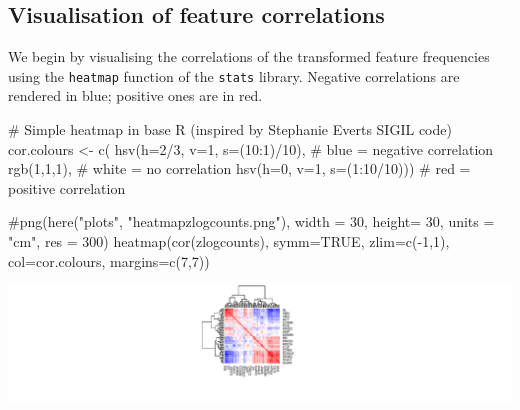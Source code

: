 \documentclass[
  letterpaper,
  DIV=11,
  numbers=noendperiod]{scrreprt}
\newenvironment{Shaded}{\begin{snugshade}}{\end{snugshade}}
\newcommand{\AttributeTok}[1]{\textcolor[rgb]{0.40,0.45,0.13}{#1}}
\newcommand{\CommentTok}[1]{\textcolor[rgb]{0.37,0.37,0.37}{#1}}
\newcommand{\ConstantTok}[1]{\textcolor[rgb]{0.56,0.35,0.01}{#1}}
\newcommand{\DecValTok}[1]{\textcolor[rgb]{0.68,0.00,0.00}{#1}}
\newcommand{\FunctionTok}[1]{\textcolor[rgb]{0.28,0.35,0.67}{#1}}
\newcommand{\NormalTok}[1]{\textcolor[rgb]{0.00,0.23,0.31}{#1}}
\newcommand{\OtherTok}[1]{\textcolor[rgb]{0.00,0.23,0.31}{#1}}
\newcommand{\SpecialCharTok}[1]{\textcolor[rgb]{0.37,0.37,0.37}{#1}}
\begin{document}
\subsection{Visualisation of feature
correlations}\label{visualisation-of-feature-correlations}

We begin by visualising the correlations of the transformed feature
frequencies using the \texttt{heatmap} function of the \texttt{stats}
library. Negative correlations are rendered in blue; positive ones are
in red.

\begin{Shaded}
\begin{Highlighting}[]
\CommentTok{\# Simple heatmap in base R (inspired by Stephanie Evert\textquotesingle{}s SIGIL code)}
\NormalTok{cor.colours }\OtherTok{\textless{}{-}} \FunctionTok{c}\NormalTok{(}
  \FunctionTok{hsv}\NormalTok{(}\AttributeTok{h=}\DecValTok{2}\SpecialCharTok{/}\DecValTok{3}\NormalTok{, }\AttributeTok{v=}\DecValTok{1}\NormalTok{, }\AttributeTok{s=}\NormalTok{(}\DecValTok{10}\SpecialCharTok{:}\DecValTok{1}\NormalTok{)}\SpecialCharTok{/}\DecValTok{10}\NormalTok{), }\CommentTok{\# blue = negative correlation }
  \FunctionTok{rgb}\NormalTok{(}\DecValTok{1}\NormalTok{,}\DecValTok{1}\NormalTok{,}\DecValTok{1}\NormalTok{), }\CommentTok{\# white = no correlation }
  \FunctionTok{hsv}\NormalTok{(}\AttributeTok{h=}\DecValTok{0}\NormalTok{, }\AttributeTok{v=}\DecValTok{1}\NormalTok{, }\AttributeTok{s=}\NormalTok{(}\DecValTok{1}\SpecialCharTok{:}\DecValTok{10}\SpecialCharTok{/}\DecValTok{10}\NormalTok{))) }\CommentTok{\# red = positive correlation}

\CommentTok{\#png(here("plots", "heatmapzlogcounts.png"), width = 30, height= 30, units = "cm", res = 300)}
\FunctionTok{heatmap}\NormalTok{(}\FunctionTok{cor}\NormalTok{(zlogcounts), }
        \AttributeTok{symm=}\ConstantTok{TRUE}\NormalTok{, }
        \AttributeTok{zlim=}\FunctionTok{c}\NormalTok{(}\SpecialCharTok{{-}}\DecValTok{1}\NormalTok{,}\DecValTok{1}\NormalTok{), }
        \AttributeTok{col=}\NormalTok{cor.colours, }
        \AttributeTok{margins=}\FunctionTok{c}\NormalTok{(}\DecValTok{7}\NormalTok{,}\DecValTok{7}\NormalTok{))}
\end{Highlighting}
\end{Shaded}

\includegraphics{AppendixG_files/figure-pdf/heatmap-1.pdf}
\end{document}
